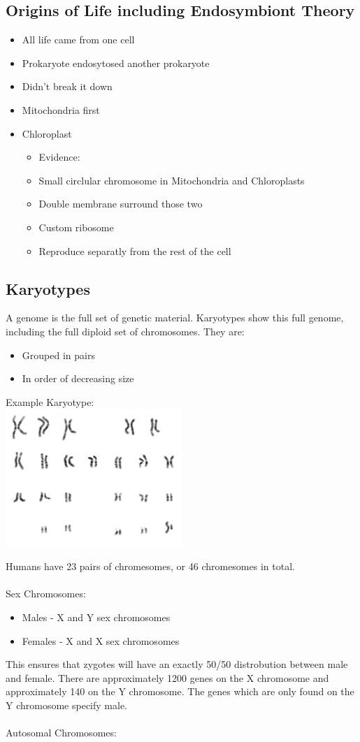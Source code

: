 \documentclass{article}
\begin{document}
\subsection{Origins of Life including Endosymbiont Theory}
\begin{itemize}
\item All life came from one cell
\item Prokaryote endosytosed another prokaryote
\item Didn't break it down
\item Mitochondria first
\item Chloroplast
\begin{itemize}
\item Evidence:
\item Small circlular chromosome in Mitochondria and Chloroplasts
\item Double membrane surround those two
\item Custom ribosome
\item Reproduce separatly from the rest of the cell
\end{itemize}
\end{itemize}

\subsection{Karyotypes}

A genome is the full set of genetic material. Karyotypes show this full genome, including the full diploid set of
chromosomes. They are:
\begin{itemize}
\item Grouped in pairs
\item In order of decreasing size
\end{itemize}

Example Karyotype:\\
\includegraphics[width=0.5\textwidth]{karyotype}

Humans have 23 pairs of chromesomes, or 46 chromesomes in total.
\\
\\
Sex Chromosomes:
\begin{itemize}
\item Males - X and Y sex chromosomes
\item Females - X and X sex chromosomes
\end{itemize}
This ensures that zygotes will have an exactly 50/50 distrobution between male and female. There are approximately
1200 genes on the X chromosome and approximately 140 on the Y chromosome. The genes which are only found on the Y
chromosome specify male.
\\
\\
Autosomal Chromosomes:
\end{document}
